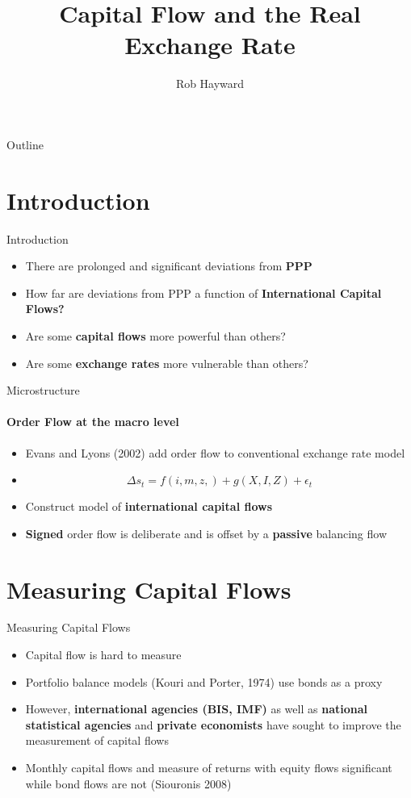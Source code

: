 \documentclass[14pt,xcolor=pdftex,dvipsnames,table]{beamer}
\title{Capital Flow and the Real Exchange Rate}
\author{Rob Hayward}
\begin{document}
\begin{frame}
\titlepage
\end{frame}

\begin{frame}{Outline}
\tableofcontents
\end{frame}

\section{Introduction}
\begin{frame}{Introduction}
\begin{itemize}[<+-| alert@+>]
\item There are prolonged and significant deviations from \textbf{PPP}
\item How far are deviations from PPP a function of \textbf{International Capital Flows?}
\item Are some \textbf{capital flows} more powerful than others? 
\item Are some \textbf{exchange rates} more vulnerable than others?  
\end{itemize}
\end{frame}

\begin{frame}{Microstructure}
\framesubtitle{Order Flow at the macro level}
\begin{itemize}[<+-| alert@+>]
\item Evans and Lyons (2002) add order flow to conventional exchange rate model
\item \begin{equation}
 \Delta s_t=f(i,m,z,)+g(X,I,Z)+\epsilon_t
\end{equation}
\item Construct model of  \textbf{international capital flows} 
\item \textbf{Signed} order flow is deliberate and is offset by a \textbf{passive} balancing flow
\end{itemize}
\end{frame}


\section{Measuring Capital Flows}
\begin{frame}{Measuring Capital Flows}
\begin{itemize}[<+-| alert@+>]
\item Capital flow is hard to measure
\item Portfolio balance models (Kouri and Porter, 1974) use bonds as a proxy
\item However, \textbf{international agencies (BIS, IMF)} as well as \textbf {national statistical agencies} and \textbf{private economists} have sought to improve the measurement of capital flows
\item Monthly capital flows and measure of returns with equity flows significant while bond flows are not (Siouronis 2008)
\end{itemize}
\end{frame}
\end{document}
